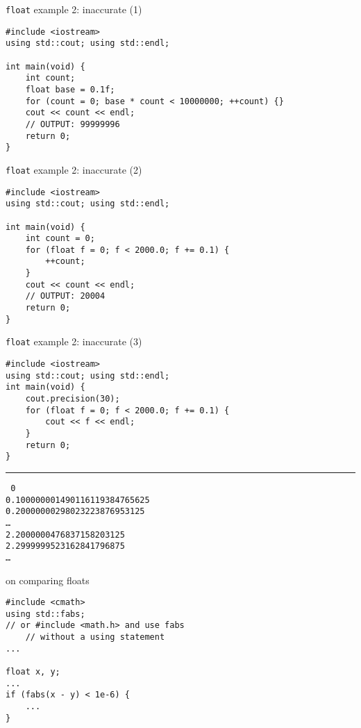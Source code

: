 \begin{frame}[fragile,label=floatEx2In1]{\texttt{float} example 2: inaccurate (1)}
\lstset{
    language=C++,
    style=smaller
}
\begin{lstlisting}
#include <iostream>
using std::cout; using std::endl;

int main(void) {
    int count;
    float base = 0.1f;
    for (count = 0; base * count < 10000000; ++count) {}
    cout << count << endl;
    // OUTPUT: 99999996
    return 0;
}
\end{lstlisting}
\end{frame}

\begin{frame}[fragile,label=floatEx2In2]{\texttt{float} example 2: inaccurate (2)}
\lstset{
    language=C++,
    style=smaller
}
\begin{lstlisting}
#include <iostream>
using std::cout; using std::endl;

int main(void) {
    int count = 0;
    for (float f = 0; f < 2000.0; f += 0.1) {
        ++count;
    }
    cout << count << endl;
    // OUTPUT: 20004
    return 0;
}
\end{lstlisting}
\end{frame}

\begin{frame}[fragile,label=floatEx2In3]{\texttt{float} example 2: inaccurate (3)}
\lstset{
    language=C++,
    style=smaller
}
\begin{lstlisting}
#include <iostream>
using std::cout; using std::endl;
int main(void) {
    cout.precision(30);
    for (float f = 0; f < 2000.0; f += 0.1) {
        cout << f << endl;
    }
    return 0;
}
\end{lstlisting}
\hrule
\small\tt
0 \\
0.100000001490116119384765625 \\
0.20000000298023223876953125 \\
\ldots \\
2.2000000476837158203125 \\
2.2999999523162841796875 \\
\ldots
\end{frame}

\begin{frame}{on comparing floats}
\lstset{
    language=C++,
    style=small
}
\begin{lstlisting}
#include <cmath>
using std::fabs;
// or #include <math.h> and use fabs
    // without a using statement
...

float x, y;
...
if (fabs(x - y) < 1e-6) {
    ...
}
\end{lstlisting}
\end{frame}

